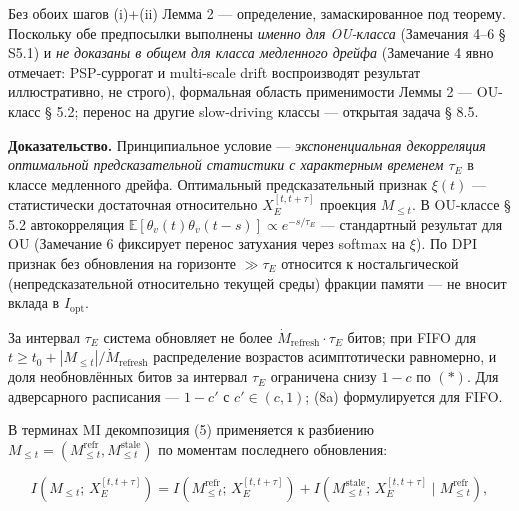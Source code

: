\documentclass[pdflatex,sn-mathphys-ay]{sn-jnl}
\begin{document}
Без обоих шагов (i)+(ii) Лемма 2 --- определение, замаскированное под теорему. Поскольку обе предпосылки выполнены \emph{именно для OU-класса} (Замечания 4--6 § S5.1) и \emph{не доказаны в общем для класса медленного дрейфа} (Замечание 4 явно отмечает: PSP-суррогат и multi-scale drift воспроизводят результат иллюстративно, не строго), формальная область применимости Леммы 2 --- OU-класс § 5.2; перенос на другие slow-driving классы --- открытая задача § 8.5.



\textbf{Доказательство.} Принципиальное условие --- \emph{экспоненциальная декорреляция оптимальной предсказательной статистики с характерным временем \(\tau_E\)} в классе медленного дрейфа. Оптимальный предсказательный признак \(\xi(t)\) --- статистически достаточная относительно \(X_E^{[t, t+\tau]}\) проекция \(M_{\le t}\). В OU-классе § 5.2 автокорреляция \(\mathbb{E}[\theta_v(t)\theta_v(t-s)] \propto e^{-s/\tau_E}\) --- стандартный результат для OU (Замечание 6 фиксирует перенос затухания через softmax на \(\xi\)). По DPI признак без обновления на горизонте \(\gg \tau_E\) относится к ностальгической (непредсказательной относительно текущей среды) фракции памяти --- не вносит вклада в \(I_{\text{opt}}\).



За интервал \(\tau_E\) система обновляет не более \(\dot{M}_{\text{refresh}} \cdot \tau_E\) битов; при FIFO для \(t \ge t_0 + |M_{\le t}|/\dot{M}_{\text{refresh}}\) распределение возрастов асимптотически равномерно, и доля необновлённых битов за интервал \(\tau_E\) ограничена снизу \(1 - c\) по \((*)\). Для адверсарного расписания --- \(1 - c'\) с \(c' \in (c, 1)\); (8a) формулируется для FIFO.



В терминах MI декомпозиция (5) применяется к разбиению \(M_{\le t} = (M_{\le t}^{\text{refr}}, M_{\le t}^{\text{stale}})\) по моментам последнего обновления:



\[I(M_{\le t};\, X_E^{[t,t+\tau]}) = I(M_{\le t}^{\text{refr}};\, X_E^{[t,t+\tau]}) + I(M_{\le t}^{\text{stale}};\, X_E^{[t,t+\tau]} \mid M_{\le t}^{\text{refr}}),\]
\end{document}
